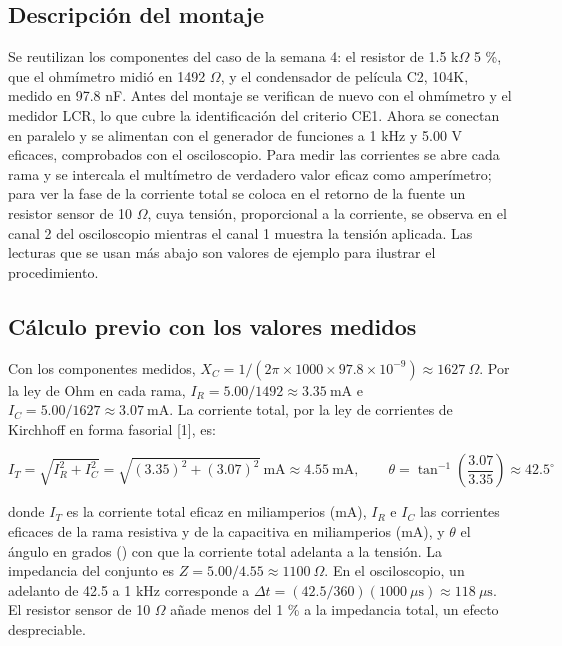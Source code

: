 \documentclass[11pt,letterpaper]{article}
\begin{document}
\subsection{Descripción del montaje}

Se reutilizan los componentes del caso de la semana 4: el resistor de 1.5 k\ensuremath{\Omega} \textpm{}5 \%, que el ohmímetro midió en 1492 \ensuremath{\Omega}, y el condensador de película C2, 104K, medido en 97.8 nF. Antes del montaje se verifican de nuevo con el ohmímetro y el medidor LCR, lo que cubre la identificación del criterio CE1. Ahora se conectan en paralelo y se alimentan con el generador de funciones a 1 kHz y 5.00 V eficaces, comprobados con el osciloscopio. Para medir las corrientes se abre cada rama y se intercala el multímetro de verdadero valor eficaz como amperímetro; para ver la fase de la corriente total se coloca en el retorno de la fuente un resistor sensor de 10 \ensuremath{\Omega}, cuya tensión, proporcional a la corriente, se observa en el canal 2 del osciloscopio mientras el canal 1 muestra la tensión aplicada. Las lecturas que se usan más abajo son valores de ejemplo para ilustrar el procedimiento.

\subsection{Cálculo previo con los valores medidos}

Con los componentes medidos, $X_C = 1/(2\pi \times 1000 \times 97.8 \times 10^{-9}) \approx 1627\ \Omega$. Por la ley de Ohm en cada rama, $I_R = 5.00/1492 \approx 3.35\ \text{mA}$ e $I_C = 5.00/1627 \approx 3.07\ \text{mA}$. La corriente total, por la ley de corrientes de Kirchhoff en forma fasorial [1], es:

\begin{equation}
  I_T = \sqrt{I_R^{2} + I_C^{2}} = \sqrt{(3.35)^2 + (3.07)^2}\ \text{mA} \approx 4.55\ \text{mA}, \qquad \theta = \tan^{-1}\!\left(\frac{3.07}{3.35}\right) \approx 42.5^\circ
\end{equation}

donde $I_T$ es la corriente total eficaz en miliamperios (mA), $I_R$ e $I_C$ las corrientes eficaces de la rama resistiva y de la capacitiva en miliamperios (mA), y $\theta$ el ángulo en grados (\textdegree{}) con que la corriente total adelanta a la tensión. La impedancia del conjunto es $Z = 5.00/4.55 \approx 1100\ \Omega$. En el osciloscopio, un adelanto de 42.5\textdegree{} a 1 kHz corresponde a $\Delta t = (42.5/360)(1000\ \mu\text{s}) \approx 118\ \mu\text{s}$. El resistor sensor de 10 \ensuremath{\Omega} añade menos del 1 \% a la impedancia total, un efecto despreciable.
\end{document}
